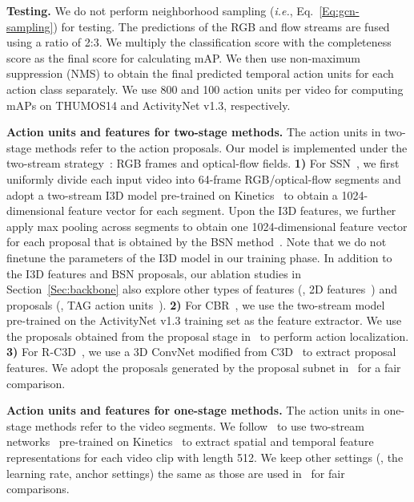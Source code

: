 \documentclass[10pt,journal,compsoc]{IEEEtran}
\begin{document}
	
	
	
	\noindent \textbf{Testing.} 
	We do not perform neighborhood sampling (\emph{i.e.}, Eq.~\eqref{Eq:gcn-sampling}) for testing. The predictions of the RGB and flow streams are fused using a ratio of 2:3.
	We multiply the classification score with the completeness score as the final score for calculating mAP.
	We then use non-maximum suppression (NMS) to obtain the final predicted temporal action units for each action class separately.
	We use 800 and 100 action units per video for computing mAPs on THUMOS14 and ActivityNet v1.3, respectively. 
	
	\noindent \textbf{Action units and features for two-stage methods.} The action units in two-stage methods refer to the action proposals.
	Our model is implemented under the two-stream strategy~\cite{simonyan2014two}: RGB frames and optical-flow fields.
	\textbf{1)} For SSN~\cite{zhao2017temporal}, we 
	first uniformly divide each input video into 64-frame RGB/optical-flow segments and 
	adopt a two-stream I3D model pre-trained on Kinetics~\cite{carreira2017quo}
	to obtain a 1024-dimensional feature vector for each segment.
	Upon the I3D features, we further apply max pooling across segments to obtain one 1024-dimensional feature vector for each proposal that is obtained by the BSN method~\cite{lin2018bsn}. Note that we do not finetune the parameters of the I3D model in our training phase. 
	In addition to the I3D features and BSN proposals, our ablation studies in Section~\ref{Sec:backbone} also explore other types of features (\eg, 2D features~\cite{lin2018bsn}) and proposals  (\eg, TAG action units~\cite{zhao2017temporal}).
	\textbf{2)} For CBR~\cite{gao2017cascaded}, we use the two-stream model~\cite{xiong2016cuhk} pre-trained on the ActivityNet v1.3 training set as the feature extractor. We use the proposals obtained from the proposal stage in~\cite{gao2017cascaded} to perform action localization.
	\textbf{3)} For R-C3D~\cite{xu2017r}, we use a 3D ConvNet modified from C3D~\cite{tran2015learning} to extract proposal features. We adopt the  proposals generated by the proposal subnet in~\cite{xu2017r} for a fair comparison.
	
	\noindent \textbf{Action units and features for one-stage methods.}
	The action units in one-stage methods refer to the video segments. We follow~\cite{huang2019decoupling} to use two-stream networks~\cite{simonyan2014two}
	pre-trained on Kinetics~\cite{carreira2017quo} to extract spatial and temporal feature representations for each video clip with length 512. We keep other settings (\eg, the learning rate, anchor settings) the same as those are used  in~\cite{huang2019decoupling} for fair comparisons.
	
\end{document}
